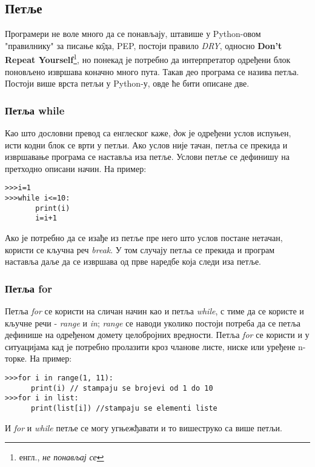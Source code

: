 \subsection{Петље}

Програмери не воле много да се понављају, штавише у Python-овом "правилнику" за писање к\^{о}да, PEP\cite{PEP}, постоји правило \emph{DRY}, односно \textbf{Don't Repeat Yourself}\footnote{енгл., \emph{не понављај се}}, но понекад је потребно да интерпретатор одређени блок поновљено извршава коначно много пута. Такав део програма се назива петља. Постоји више врста петљи у Python-у, овде ће бити описане две.

\subsubsection{Петља while}

Као што дословни превод са енглеског каже, \emph{док} је одређени услов испуњен, исти кодни блок се врти у петљи. Ако услов није тачан, петља се прекида и извршавање програма се наставља иза петље. Услови петље се дефинишу на претходно описани начин. На пример:

\begin{lstlisting}[caption = Пример while петље, label = while]
>>>i=1
>>>while i<=10:
       print(i)
       i=i+1
\end{lstlisting}

Ако је потребно да се изађе из петље пре него што услов постане нетачан, користи се кључна реч \emph{break}. У том случају петља се прекида и програм наставља даље да се извршава од прве наредбе која следи иза петље.

\subsubsection{Петља for}

Петља \emph{for} се користи на сличан начин као и петља \emph{while}, с тиме да се користе и кључне речи - \emph{range} и \emph{in}; \emph{range} се наводи уколико постоји потреба да се петља дефинише на одређеном домету целобројних вредности. Петља \emph{for} се користи и у ситуацијама кад је потребно пролазити кроз чланове листе, ниске или уређене n-торке. На пример:

\begin{lstlisting}[caption = Примери \emph{for} петље, label = for]
>>>for i in range(1, 11):
      print(i) // stampaju se brojevi od 1 do 10
>>>for i in list:
      print(list[i]) //stampaju se elementi liste
\end{lstlisting}

И \emph{for} и \emph{while} петље се могу угњежђавати и то вишеструко са више петљи.
